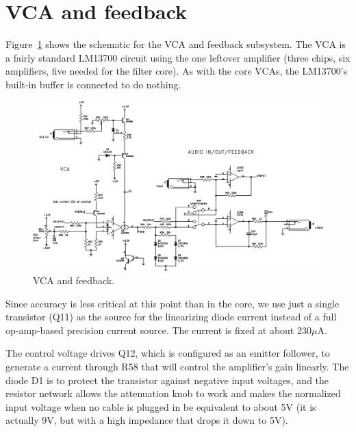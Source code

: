 
\section{VCA and feedback}

Figure~\ref{fig:vca} shows the schematic for the VCA and feedback subsystem. 
The VCA is a fairly standard LM13700 circuit using the one leftover
amplifier (three chips, six amplifiers, five needed for the filter
core).  As with the core VCAs, the LM13700's built-in buffer is connected to
do nothing.

\begin{figure}
\centering\includegraphics[width=\linewidth]{vca}\par
\caption{VCA and feedback.}\label{fig:vca}
\end{figure}

Since accuracy is less critical at this point than in the core, we use just
a single transistor (Q11) as the source for the linearizing diode current instead of a
full op-amp-based precision current source.  The current is fixed at about
230$\mu$A.

The control voltage drives Q12, which is configured as an emitter follower,
to generate a current through R58 that will control the amplifier's gain
linearly.  The diode D1 is to protect the transistor against negative input
voltages, and the resistor network allows the attenuation knob to work and
makes the normalized input voltage when no cable is plugged in be equivalent
to about 5V (it is actually 9V, but with a high impedance that drops it down
to 5V).


